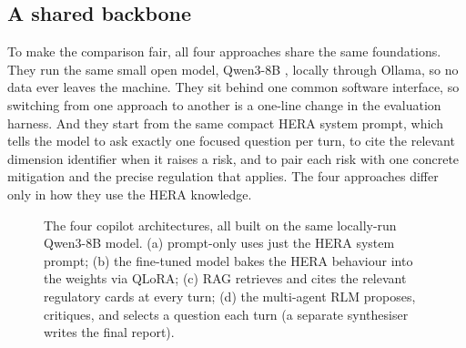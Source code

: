 \documentclass[11pt]{article}
\begin{document}
\subsection{A shared backbone}
To make the comparison fair, all four approaches share the same foundations. They run the
same small open model, Qwen3-8B \citep{qwen3}, locally through Ollama, so no data
ever leaves the machine. They sit behind one common software interface, so switching from
one approach to another is a one-line change in the evaluation harness. And they start
from the same compact HERA system prompt, which tells the model to ask exactly one
focused question per turn, to cite the relevant dimension identifier when it raises a
risk, and to pair each risk with one concrete mitigation and the precise regulation that
applies. The four approaches differ only in how they use the HERA knowledge.
\begin{figure}[t]
\centering
{}
\caption{The four copilot architectures, all built on the same locally-run Qwen3-8B
model. (a) prompt-only uses just the HERA system prompt; (b) the fine-tuned model bakes
the HERA behaviour into the weights via QLoRA; (c) RAG retrieves and cites the relevant
regulatory cards at every turn; (d) the multi-agent RLM proposes, critiques, and selects
a question each turn (a separate synthesiser writes the final report).}
\label{fig:arch}
\end{figure}
\end{document}
